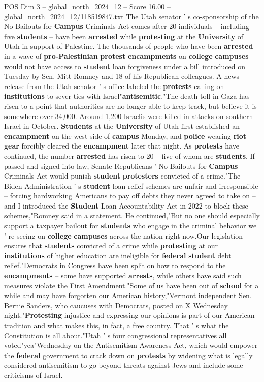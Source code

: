 \begin{textsample}{POS Dim 3 – global\_north\_2024\_12 – Score 16.00 – global\_north\_2024\_12/118519847.txt}  \label{ex:f3_pos_236}
The Utah senator ' s co-sponsorship of the No Bailouts for \textbf{Campus} Criminals Act comes after 20 individuals -- including five \textbf{students} -- have been \textbf{arrested} while \textbf{protesting} at the \textbf{University} of Utah in support of Palestine.
The thousands of people who have been \textbf{arrested} in a wave of \textbf{pro-Palestinian} \textbf{protest} \textbf{encampments} on \textbf{college} \textbf{campuses} would not have access to \textbf{student} loan forgiveness under a bill introduced on Tuesday by Sen.
Mitt Romney and 18 of his Republican colleagues.
A news release from the Utah senator ' s office labeled the \textbf{protests} calling on \textbf{institutions} to sever ties with Israel"\textbf{antisemitic}."The death toll in Gaza has risen to a point that authorities are no longer able to keep track, but believe it is somewhere over 34,000.
Around 1,200 Israelis were killed in attacks on southern Israel in October. \textbf{Students} at the \textbf{University} of Utah first established an \textbf{encampment} on the west side of \textbf{campus} Monday, and \textbf{police} wearing \textbf{riot} \textbf{gear} forcibly cleared the \textbf{encampment} later that night.
As \textbf{protests} have continued, the number \textbf{arrested} has risen to 20 -- five of whom are \textbf{students}.
If passed and signed into law, Senate Republicans ' No Bailouts for \textbf{Campus} Criminals Act would punish \textbf{student} \textbf{protesters} convicted of a crime."The Biden Administration ' s \textbf{student} loan relief schemes are unfair and irresponsible -- forcing hardworking Americans to pay off debts they never agreed to take on -- and I introduced the \textbf{Student} Loan Accountability Act in 2022 to block these schemes,"Romney said in a statement.
He continued,"But no one should especially support a taxpayer bailout for \textbf{students} who engage in the criminal behavior we ' re seeing on \textbf{college} \textbf{campuses} across the nation right now.Our legislation ensures that \textbf{students} convicted of a crime while \textbf{protesting} at our \textbf{institutions} of higher education are ineligible for \textbf{federal} \textbf{student} debt relief."Democrats in Congress have been split on how to respond to the \textbf{encampments} -- some have supported \textbf{arrests}, while others have said such measures violate the First Amendment."Some of us have been out of \textbf{school} for a while and may have forgotten our American history,"Vermont independent Sen.
Bernie Sanders, who caucuses with Democrats, posted on X Wednesday night."\textbf{Protesting} injustice and expressing our opinions is part of our American tradition and what makes this, in fact, a free country.
That ' s what the Constitution is all about."Utah ' s four congressional representatives all voted"yea"Wednesday on the Antisemitism Awareness Act, which would empower the \textbf{federal} government to crack down on \textbf{protests} by widening what is legally considered antisemitism to go beyond threats against Jews and include some criticisms of Israel.


\end{textsample}
